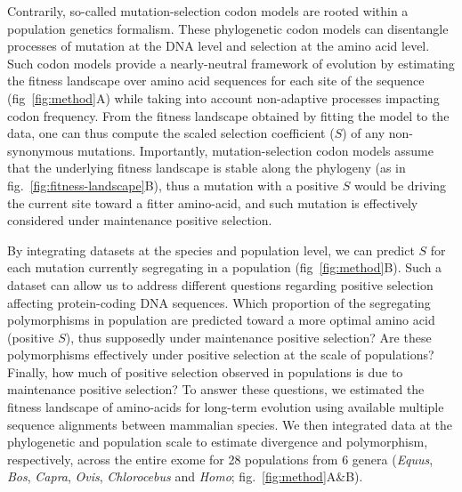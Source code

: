 \documentclass{article}
\newcommand{\Sphy}{S}
\begin{document}
    Contrarily, so-called mutation-selection codon models are rooted within a population genetics formalism\cite{halpern_evolutionary_1998, mccandlish_modeling_2014}.
    These phylogenetic codon models can disentangle processes of mutation at the DNA level and selection at the amino acid level.
    Such codon models provide a nearly-neutral framework of evolution by estimating the fitness landscape over amino acid sequences for each site of the sequence (fig~\ref{fig:method}A) while taking into account non-adaptive processes impacting codon frequency\cite{halpern_evolutionary_1998, rodrigue_mechanistic_2010, tamuri_estimating_2012, latrille_improved_2022}.
    From the fitness landscape obtained by fitting the model to the data, one can thus compute the scaled selection coefficient ($\Sphy$) of any non-synonymous mutations.
    Importantly, mutation-selection codon models assume that the underlying fitness landscape is stable along the phylogeny (as in fig.~\ref{fig:fitness-landscape}B), thus a mutation with a positive $\Sphy$ would be driving the current site toward a fitter amino-acid, and such mutation is effectively considered under maintenance positive selection.

    By integrating datasets at the species and population level, we can predict $\Sphy$ for each mutation currently segregating in a population (fig~\ref{fig:method}B).
    Such a dataset can allow us to address different questions regarding positive selection affecting protein-coding DNA sequences.
    Which proportion of the segregating polymorphisms in population are predicted toward a more optimal amino acid (positive $\Sphy$), thus supposedly under maintenance positive selection?
    Are these polymorphisms effectively under positive selection at the scale of populations?
    Finally, how much of positive selection observed in populations is due to maintenance positive selection?
    To answer these questions, we estimated the fitness landscape of amino-acids for long-term evolution using available multiple sequence alignments between mammalian species\cite{ranwez_orthomam_2007, howe_ensembl_2021}.
    We then integrated data at the phylogenetic and population scale to estimate divergence and polymorphism, respectively, across the entire exome for 28 populations from 6 genera (\textit{Equus},  \textit{Bos}, \textit{Capra}, \textit{Ovis}, \textit{Chlorocebus} and \textit{Homo}; fig.~\ref{fig:method}A\&B).
\end{document}
